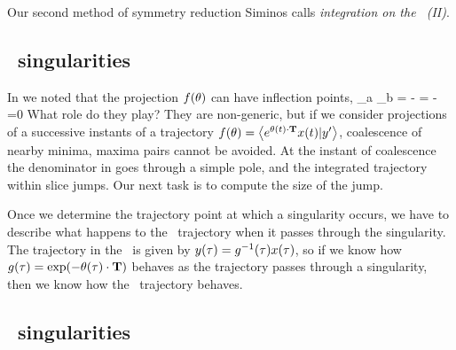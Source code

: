 {Our second method of symmetry reduction Siminos
 calls {\em integration on the
\slice\ (II)}.


\subsection{\Slice\ singularities}
\label{sect:sliceSing}

In  we noted that the projection $f({\bf \theta})$
can have inflection points,
\beq
{}
     {\partial \gSpace_a \partial \gSpace_b}
    =
  - =
  - =0
What role do they play? They are non-generic, but
if we consider projections of a successive instants of a trajectory
$f({\bf \theta})=\left\langle {e^{\ensuremath{{\bf \theta}}(t) \cdot \ensuremath{\mathbf{T}}} \ensuremath{x}(t)}|{{y'}} \right\rangle$, coalescence of
nearby minima, maxima pairs cannot be avoided. At the instant of coalescence
the denominator in  goes through a simple pole,
and the integrated trajectory within slice jumps. Our next task is
to compute the size of the jump.

Once we determine the trajectory point at which
a singularity occurs, we have to describe what happens to the \reducedsp\ trajectory when it passes through the singularity. The trajectory in the \reducedsp\ is given by $y(\tau)=g^{-1}(\tau) x(\tau)$, so if we know how $g(\tau)=\exp({-{\bf \theta}(\tau) \cdot \mathbf{T}})$ behaves as the trajectory passes through a singularity, then we know how the \reducedsp\ trajectory behaves.

\subsection{\CLe\ singularities}
\label{sect:cLeSing}

}
